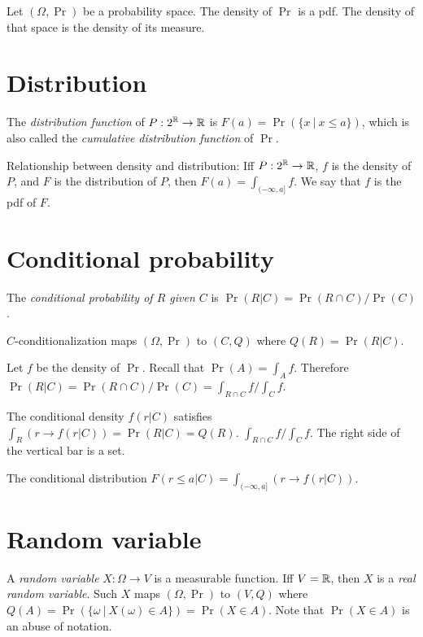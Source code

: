Let \((\Omega,\Pr)\) be a probability space.
The density of \(\Pr\) is a pdf.
The density of that space is the density of its measure.

\section{Distribution}

%
%
The \emph{distribution function} of \(P:2^{\mathbb{R}}\to\mathbb{R}\) is \(F(a) = \Pr(\{ x~|~x \le a\})\),
which is also called the \emph{cumulative distribution function} of \(\Pr\).

Relationship between density and distribution:
Iff \(P : 2^{\mathbb{R}} \to \mathbb{R}\),
\(f\) is the density of \(P\), and
\(F\) is the distribution of \(P\),
then \(F(a) = \int_{(-\infty,a]} f\).
We say that \(f\) is the pdf of \(F\).

\section{Conditional probability}

%
%
The \emph{conditional probability of \(R\) given \(C\)}
is \(\Pr(R|C) = \Pr(R \cap C) / \Pr(C)\).

\(C\)-conditionalization maps \((\Omega,\Pr)\) to \((C,Q)\)
where \(Q(R) = \Pr(R|C)\).

Let \(f\) be the density of \(\Pr\).
Recall that \(\Pr(A) = \int_A f\).
Therefore \(\Pr(R|C) = \Pr(R \cap C)/\Pr(C) = \int_{R \cap C} f / \int_C f\).

%
%
The conditional density \(f(r|C)\) satisfies \(\int_R (r \to f(r|C)) = \Pr(R|C) = Q(R)\).
\(\int_{R \cap C} f / \int_C f\).
The right side of the vertical bar is a set.

%
%
The conditional distribution
\(F(r \le a|C) = \int_{(-\infty,a]} (r \to f(r|C))\).

\section{Random variable}

%
%
%
A \emph{random variable} \(X : \Omega \to V\)
is a measurable function.
%
%
Iff \(V = \mathbb{R}\), then \(X\) is a \emph{real random variable}.
%
Such \(X\) maps
\((\Omega,\Pr)\) to \((V,Q)\)
where \(Q(A) = \Pr(\{\omega~|~X(\omega)\in A\}) = \Pr(X\in A)\).
Note that \(\Pr(X \in A)\) is an abuse of notation.

